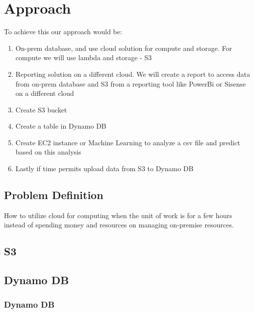 \chapter{Approach}\label{chap:approach}

To achieve this our approach would be:

\begin{enumerate}
 \item On-prem database, and use cloud solution for compute and storage. For compute we will use lambda and storage - S3
 \item Reporting solution on a different cloud. We will create a report to access data from on-prem database and S3 from a reporting tool like PowerBi or Sisense on a different cloud
 \item Create S3 bucket
 \item Create a table in Dynamo DB
 \item Create EC2 instance or Machine Learning to analyze a csv file and predict based on this analysis
 \item Lastly if time permits upload data from S3 to Dynamo DB
 \end{enumerate} 

\section{Problem Definition}

How to utilize cloud for computing when the unit of work is for a few hours instead of spending money and resources on managing on-premise resources.

\section{S3}


\section{Dynamo DB}


\subsection*{Dynamo DB}
